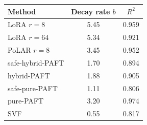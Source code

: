 \begin{tabular}{lcc}
\toprule
\textbf{Method} & \textbf{Decay rate $b$} & $R^2$ \\
\midrule
LoRA $r{=}8$ & 5.45 & 0.959 \\
LoRA $r{=}64$ & 5.34 & 0.921 \\
PoLAR $r{=}8$ & 3.45 & 0.952 \\
safe-hybrid-PAFT & 1.70 & 0.894 \\
hybrid-PAFT & 1.88 & 0.905 \\
safe-pure-PAFT & 1.11 & 0.806 \\
pure-PAFT & 3.20 & 0.974 \\
SVF & 0.55 & 0.817 \\
\bottomrule
\end{tabular}